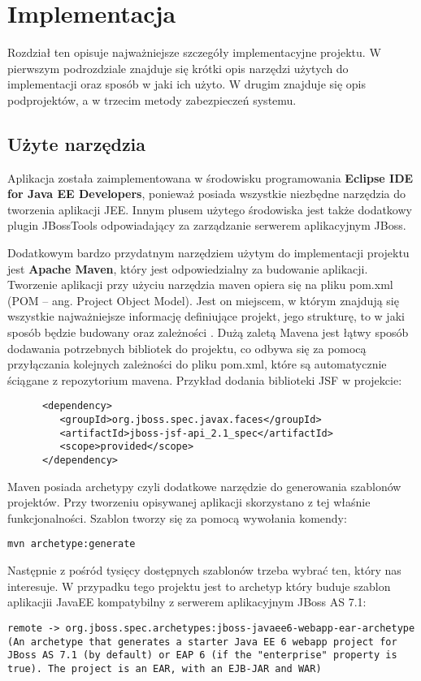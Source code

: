 \chapter{Implementacja}
\label{cha:implementacja}
Rozdział ten opisuje najważniejsze szczegóły implementacyjne projektu. W pierwszym podrozdziale znajduje się krótki opis narzędzi użytych do implementacji oraz sposób w jaki ich użyto. W drugim znajduje się opis podprojektów, a w trzecim metody zabezpieczeń systemu.
\section{Użyte narzędzia}
Aplikacja została zaimplementowana w środowisku programowania \textbf{Eclipse IDE for Java EE Developers}, ponieważ posiada wszystkie niezbędne narzędzia do tworzenia aplikacji JEE. Innym plusem użytego środowiska jest także dodatkowy plugin JBossTools odpowiadający za zarządzanie serwerem aplikacyjnym JBoss.

Dodatkowym bardzo przydatnym narzędziem użytym do implementacji projektu jest \textbf{Apache Maven}, który jest odpowiedzialny za budowanie aplikacji. Tworzenie aplikacji przy użyciu narzędzia maven opiera się na pliku pom.xml (POM – ang. Project Object Model). Jest on miejscem, w którym znajdują się wszystkie najważniejsze informację definiujące projekt, jego strukturę, to w jaki sposób będzie budowany oraz zależności \cite{MV01}. Dużą zaletą Mavena jest łątwy sposób dodawania potrzebnych bibliotek do projektu, co odbywa się za pomocą przyłączania kolejnych zależności do pliku pom.xml, które są automatycznie ściągane z repozytorium mavena. Przykład dodania biblioteki JSF w projekcie:
\begin{lstlisting}
      <dependency>
         <groupId>org.jboss.spec.javax.faces</groupId>
         <artifactId>jboss-jsf-api_2.1_spec</artifactId>
         <scope>provided</scope>
      </dependency>
\end{lstlisting}
Maven posiada archetypy czyli dodatkowe narzędzie do generowania szablonów projektów. Przy tworzeniu opisywanej aplikacji skorzystano z tej właśnie funkcjonalności. Szablon tworzy się za pomocą wywołania komendy:
\begin{lstlisting}
mvn archetype:generate 
\end{lstlisting}
Następnie z pośród tysięcy dostępnych szablonów trzeba wybrać ten, który nas interesuje. W przypadku tego projektu jest to archetyp który buduje szablon aplikacjii JavaEE kompatybilny z serwerem aplikacyjnym JBoss AS 7.1:
\begin{lstlisting}[breaklines=true]
remote -> org.jboss.spec.archetypes:jboss-javaee6-webapp-ear-archetype (An archetype that generates a starter Java EE 6 webapp project for JBoss AS 7.1 (by default) or EAP 6 (if the "enterprise" property is true). The project is an EAR, with an EJB-JAR and WAR)
\end{lstlisting}


